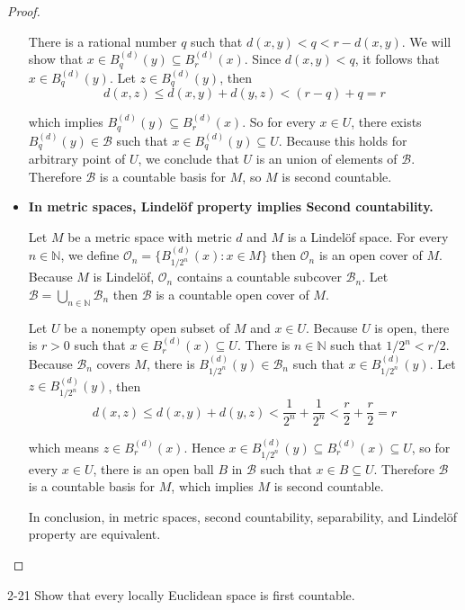 \begin{proof}
\begin{itemize}
		      There is a rational number $q$ such that $d(x, y) < q < r - d(x, y)$. We will show that $x\in B^{(d)}_{q}(y) \subseteq B^{(d)}_{r}(x)$. Since $d(x, y) < q$, it follows that $x\in B^{(d)}_{q}(y)$. Let $z\in B^{(d)}_{q}(y)$, then
		      \[
			      d(x, z)\leq d(x, y) + d(y, z) < (r - q) + q = r
		      \]

		      which implies $B^{(d)}_{q}(y) \subseteq B^{(d)}_{r}(x)$. So for every $x\in U$, there exists $B^{(d)}_{q}(y)\in\mathscr{B}$ such that $x\in B^{(d)}_{q}(y)\subseteq U$. Because this holds for arbitrary point of $U$, we conclude that $U$ is an union of elements of $\mathscr{B}$. Therefore $\mathscr{B}$ is a countable basis for $M$, so $M$ is second countable.
		\item \textbf{In metric spaces, Lindelöf property implies Second countability.}

		      Let $M$ be a metric space with metric $d$ and $M$ is a Lindelöf space. For every $n\in\mathbb{N}$, we define $\mathcal{O}_{n} = {\{ B^{(d)}_{1/2^{n}}(x) : x\in M \}}$ then $\mathcal{O}_{n}$ is an open cover of $M$. Because $M$ is Lindelöf, $\mathcal{O}_{n}$ contains a countable subcover $\mathscr{B}_{n}$. Let $\mathscr{B} = \bigcup_{n\in\mathbb{N}}\mathscr{B}_{n}$ then $\mathscr{B}$ is a countable open cover of $M$.

		      Let $U$ be a nonempty open subset of $M$ and $x\in U$. Because $U$ is open, there is $r > 0$ such that $x\in B^{(d)}_{r}(x) \subseteq U$. There is $n\in\mathbb{N}$ such that $1/2^{n} < r/2$. Because $\mathscr{B}_{n}$ covers $M$, there is $B^{(d)}_{1/2^{n}}(y)\in \mathscr{B}_{n}$ such that $x\in B^{(d)}_{1/2^{n}}(y)$. Let $z\in B^{(d)}_{1/2^{n}}(y)$, then
		      \[
			      d(x, z) \leq d(x, y) + d(y, z) < \frac{1}{2^{n}} + \frac{1}{2^{n}} < \frac{r}{2} + \frac{r}{2} = r
		      \]

		      which means $z\in B^{(d)}_{r}(x)$. Hence $x\in B^{(d)}_{1/2^{n}}(y)\subseteq B^{(d)}_{r}(x) \subseteq U$, so for every $x\in U$, there is an open ball $B$ in $\mathscr{B}$ such that $x\in B\subseteq U$. Therefore $\mathscr{B}$ is a countable basis for $M$, which implies $M$ is second countable.

		      In conclusion, in metric spaces, second countability, separability, and Lindelöf property are equivalent.
	\end{itemize}
\end{proof}

\begin{problem}{2-21}
Show that every locally Euclidean space is first countable.
\end{problem}


